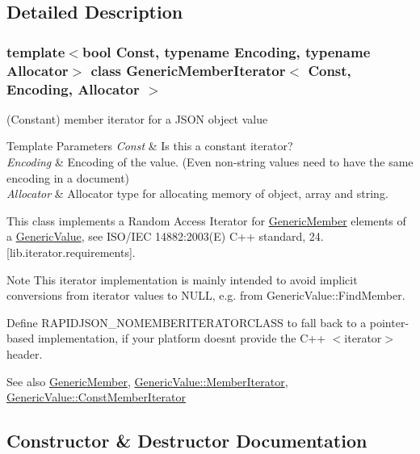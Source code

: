\subsection{Detailed Description}
\subsubsection*{template$<$bool Const, typename Encoding, typename Allocator$>$\newline
class Generic\+Member\+Iterator$<$ Const, Encoding, Allocator $>$}

(Constant) member iterator for a J\+S\+ON object value 


\begin{DoxyTemplParams}{Template Parameters}
{\em Const} & Is this a constant iterator? \\
\hline
{\em Encoding} & Encoding of the value. (Even non-\/string values need to have the same encoding in a document) \\
\hline
{\em Allocator} & Allocator type for allocating memory of object, array and string.\\
\hline
\end{DoxyTemplParams}
This class implements a Random Access Iterator for \hyperlink{structGenericMember}{Generic\+Member} elements of a \hyperlink{classGenericValue}{Generic\+Value}, see I\+S\+O/\+I\+EC 14882\+:2003(E) C++ standard, 24. \mbox{[}lib.\+iterator.\+requirements\mbox{]}.

\begin{DoxyNote}{Note}
This iterator implementation is mainly intended to avoid implicit conversions from iterator values to {\ttfamily N\+U\+LL}, e.\+g. from Generic\+Value\+::\+Find\+Member.

Define {\ttfamily R\+A\+P\+I\+D\+J\+S\+O\+N\+\_\+\+N\+O\+M\+E\+M\+B\+E\+R\+I\+T\+E\+R\+A\+T\+O\+R\+C\+L\+A\+SS} to fall back to a pointer-\/based implementation, if your platform doesn\textquotesingle{}t provide the C++ $<$iterator$>$ header.
\end{DoxyNote}
\begin{DoxySeeAlso}{See also}
\hyperlink{structGenericMember}{Generic\+Member}, \hyperlink{classGenericValue_a349b8faae61edc42b4289726820be439}{Generic\+Value\+::\+Member\+Iterator}, \hyperlink{classGenericValue_aac08c3e660a9036d3dcb8b10ff6c61f4}{Generic\+Value\+::\+Const\+Member\+Iterator} 
\end{DoxySeeAlso}


\subsection{Constructor \& Destructor Documentation}
\mbox{\label{classGenericMemberIterator_ad0db649cdfd28d943e16e6c848613cfc}} 
